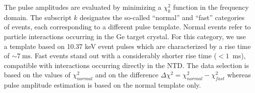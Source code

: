\documentclass[aps,nofootinbib,floatfix,showpacs,preprintnumbers,twocolumn,superscriptaddress]{revtex4}
\begin{document}
The pulse amplitudes are evaluated by minimizing a $\chi^2_k$ function in the frequency domain.%
The subscript $k$ designates the so-called ``normal'' and ``fast'' categories of events, each corresponding to a different pulse template. Normal events refer to particle interactions occurring in the Ge target crystal. For this category, we use a template based on 10.37 keV event pulses which are characterized by a rise time of $\sim7~\mathrm{ms}$. Fast events stand out with a considerably shorter rise time ($<1$~ms), compatible with interactions occurring directly in the NTD. The data selection is based on the values of $\chi^2_{normal}$ and on the difference $\Delta \chi^2=\chi^2_{normal}-\chi^2_{fast}$ whereas pulse amplitude estimation is based on the normal template only.
\end{document}
